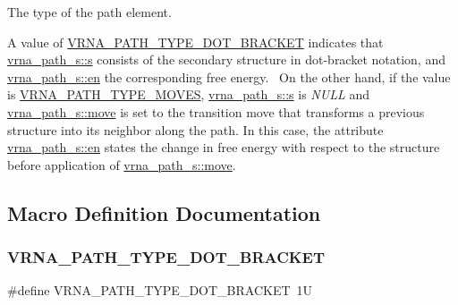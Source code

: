 The type of the path element. 

A value of \mbox{\hyperlink{group__paths_ga3e964156b52440b65fae5e2a48750d8e}{V\+R\+N\+A\+\_\+\+P\+A\+T\+H\+\_\+\+T\+Y\+P\+E\+\_\+\+D\+O\+T\+\_\+\+B\+R\+A\+C\+K\+ET}} indicates that \mbox{\hyperlink{group__paths_a141b70a59cb81d10bc65bbb7a0f6db77}{vrna\+\_\+path\+\_\+s\+::s}} consists of the secondary structure in dot-\/bracket notation, and \mbox{\hyperlink{group__paths_ac25160bf31d28097358278f367e41227}{vrna\+\_\+path\+\_\+s\+::en}} the corresponding free energy.~\newline
 On the other hand, if the value is \mbox{\hyperlink{group__paths_gaa73703da105dc6c98957fb8247c93f1f}{V\+R\+N\+A\+\_\+\+P\+A\+T\+H\+\_\+\+T\+Y\+P\+E\+\_\+\+M\+O\+V\+ES}}, \mbox{\hyperlink{group__paths_a141b70a59cb81d10bc65bbb7a0f6db77}{vrna\+\_\+path\+\_\+s\+::s}} is {\itshape N\+U\+LL} and \mbox{\hyperlink{group__paths_a13da6bb5167362199947765b06a84005}{vrna\+\_\+path\+\_\+s\+::move}} is set to the transition move that transforms a previous structure into it\textquotesingle{}s neighbor along the path. In this case, the attribute \mbox{\hyperlink{group__paths_ac25160bf31d28097358278f367e41227}{vrna\+\_\+path\+\_\+s\+::en}} states the change in free energy with respect to the structure before application of \mbox{\hyperlink{group__paths_a13da6bb5167362199947765b06a84005}{vrna\+\_\+path\+\_\+s\+::move}}. 

\subsection{Macro Definition Documentation}
\mbox{\label{group__paths_ga3e964156b52440b65fae5e2a48750d8e}} 
\subsubsection{\texorpdfstring{VRNA\_PATH\_TYPE\_DOT\_BRACKET}{VRNA\_PATH\_TYPE\_DOT\_BRACKET}}
{\footnotesize\ttfamily \#define V\+R\+N\+A\+\_\+\+P\+A\+T\+H\+\_\+\+T\+Y\+P\+E\+\_\+\+D\+O\+T\+\_\+\+B\+R\+A\+C\+K\+ET~1U}



